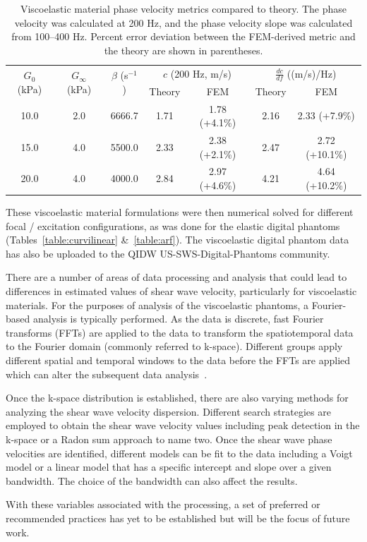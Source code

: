 \begin{table}[htb!]
    \centering
    \caption{Viscoelastic material phase velocity metrics compared to theory.
        The phase velocity was calculated at 200 Hz, and the phase velocity
        slope was calculated from 100--400 Hz.  Percent error deviation between
        the FEM-derived metric and the theory are shown in parentheses.}
    \begin{tabular}{|c|c|c|c|c|c|c|}
    \hline
    \multirow{2}{*}{$G_0$ (kPa)} & \multirow{2}{*}{$G_\infty$ (kPa)} & \multirow{2}{*}{$\beta$ (s$^{-1}$)} & \multicolumn{2}{c|}{$c$ (200 Hz, m/s)} & \multicolumn{2}{c|}{$\frac{dc}{df}$ ((m/s)/Hz)} \\ \cline{4-7}
            & & & Theory & FEM & Theory & FEM \\ 
            \hline
            10.0 & 2.0 & 6666.7 & 1.71 & 1.78 (+4.1\%) & 2.16 & 2.33 (+7.9\%) \\ \hline
            15.0 & 4.0 & 5500.0 & 2.33 & 2.38 (+2.1\%) & 2.47 & 2.72 (+10.1\%) \\ \hline
            20.0 & 4.0 & 4000.0 & 2.84 & 2.97 (+4.6\%) & 4.21 & 4.64 (+10.2\%) \\
    \hline
    \end{tabular}
\label{table:ve_data}
\end{table}

These viscoelastic material formulations were then numerical solved for
different focal / excitation configurations, as was done for the elastic
digital phantoms (Tables~\ref{table:curvilinear} \&~\ref{table:arf}).  The
viscoelastic digital phantom data has also be uploaded to the QIDW
US-SWS-Digital-Phantoms community.

There are a number of areas of data processing and analysis that could lead to
differences in estimated values of shear wave velocity, particularly for
viscoelastic materials. For the purposes of analysis of the viscoelastic
phantoms, a Fourier-based analysis is typically performed. As the data is
discrete, fast Fourier transforms (FFTs) are applied to the data to transform
the spatiotemporal data to the Fourier domain (commonly referred to k-space).
Different groups apply different spatial and temporal windows to the data
before the FFTs are applied which can alter the subsequent data
analysis~\cite{Harris1978}.

Once the k-space distribution is established, there are also varying methods
for analyzing the shear wave velocity dispersion. Different search strategies
are employed to obtain the shear wave velocity values including peak detection
in the k-space or a Radon sum approach to name two. Once the shear wave phase
velocities are identified, different models can be fit to the data including a
Voigt model or a linear model that has a specific intercept and slope over a
given bandwidth. The choice of the bandwidth can also affect the results.

With these variables associated with the processing, a set of preferred or
recommended practices has yet to be established but will be the focus of future
work.
